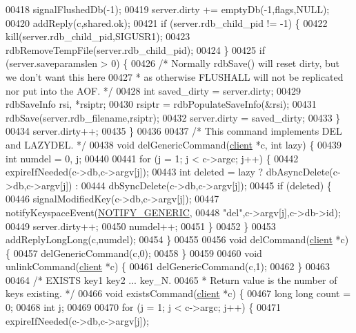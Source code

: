 \begin{DoxyCode}
00418     signalFlushedDb(-1);
00419     server.dirty += emptyDb(-1,flags,NULL);
00420     addReply(c,shared.ok);
00421     \textcolor{keywordflow}{if} (server.rdb\_child\_pid != -1) \{
00422         kill(server.rdb\_child\_pid,SIGUSR1);
00423         rdbRemoveTempFile(server.rdb\_child\_pid);
00424     \}
00425     \textcolor{keywordflow}{if} (server.saveparamslen > 0) \{
00426         \textcolor{comment}{/* Normally rdbSave() will reset dirty, but we don't want this here}
00427 \textcolor{comment}{         * as otherwise FLUSHALL will not be replicated nor put into the AOF. */}
00428         \textcolor{keywordtype}{int} saved\_dirty = server.dirty;
00429         rdbSaveInfo rsi, *rsiptr;
00430         rsiptr = rdbPopulateSaveInfo(&rsi);
00431         rdbSave(server.rdb\_filename,rsiptr);
00432         server.dirty = saved\_dirty;
00433     \}
00434     server.dirty++;
00435 \}
00436 
00437 \textcolor{comment}{/* This command implements DEL and LAZYDEL. */}
00438 \textcolor{keywordtype}{void} delGenericCommand(\hyperlink{structclient}{client} *c, \textcolor{keywordtype}{int} lazy) \{
00439     \textcolor{keywordtype}{int} numdel = 0, j;
00440 
00441     \textcolor{keywordflow}{for} (j = 1; j < c->argc; j++) \{
00442         expireIfNeeded(c->db,c->argv[j]);
00443         \textcolor{keywordtype}{int} deleted  = lazy ? dbAsyncDelete(c->db,c->argv[j]) :
00444                               dbSyncDelete(c->db,c->argv[j]);
00445         \textcolor{keywordflow}{if} (deleted) \{
00446             signalModifiedKey(c->db,c->argv[j]);
00447             notifyKeyspaceEvent(\hyperlink{server_8h_a9fa53dd1068e62365f3964ad3479eec2}{NOTIFY\_GENERIC},
00448                 \textcolor{stringliteral}{"del"},c->argv[j],c->db->id);
00449             server.dirty++;
00450             numdel++;
00451         \}
00452     \}
00453     addReplyLongLong(c,numdel);
00454 \}
00455 
00456 \textcolor{keywordtype}{void} delCommand(\hyperlink{structclient}{client} *c) \{
00457     delGenericCommand(c,0);
00458 \}
00459 
00460 \textcolor{keywordtype}{void} unlinkCommand(\hyperlink{structclient}{client} *c) \{
00461     delGenericCommand(c,1);
00462 \}
00463 
00464 \textcolor{comment}{/* EXISTS key1 key2 ... key\_N.}
00465 \textcolor{comment}{ * Return value is the number of keys existing. */}
00466 \textcolor{keywordtype}{void} existsCommand(\hyperlink{structclient}{client} *c) \{
00467     \textcolor{keywordtype}{long} \textcolor{keywordtype}{long} count = 0;
00468     \textcolor{keywordtype}{int} j;
00469 
00470     \textcolor{keywordflow}{for} (j = 1; j < c->argc; j++) \{
00471         expireIfNeeded(c->db,c->argv[j]);

\end{DoxyCode}
